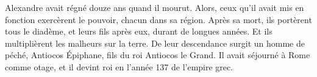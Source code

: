 Alexandre avait régné douze ans quand il mourut.
Alors, ceux qu’il avait mis en fonction exercèrent le pouvoir, chacun dans sa région.
Après sa mort, ils portèrent tous le diadème,
	et leurs fils après eux, durant de longues années.
	Et ils multiplièrent les malheurs sur la terre.
De leur descendance surgit un homme de péché,
	Antiocos Épiphane, fils du roi Antiocos le Grand.
Il avait séjourné à Rome comme otage, et il devint roi en l’année 137 de l’empire grec.
